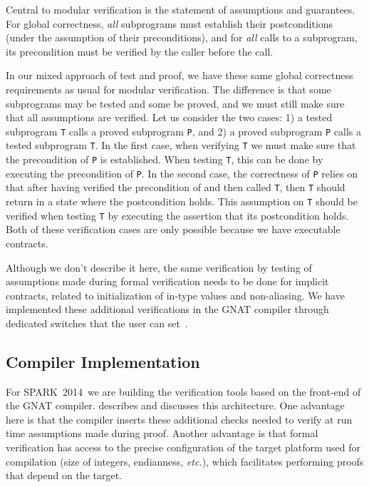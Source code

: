 \documentclass[sttt,final]{svjour}
\newcommand{\newspark}{SPARK~2014\xspace}
\newcommand{\etc}{\textit{etc.}\xspace}
\begin{document}
Central to modular verification is the statement of assumptions and
guarantees. For global correctness, \emph{all} subprograms must
establish their postconditions (under the assumption of their
preconditions), and for \emph{all} calls to a subprogram, its
precondition must be verified by the caller before the call.

In our mixed approach of test and proof, we have these same global
correctness requirements as usual for modular verification. The
difference is that some subprograms may be tested and some be proved,
and we must still make sure that all assumptions are verified. Let us
consider the two cases: 1) a tested subprogram \verb|T| calls a proved
subprogram \verb|P|, and 2) a proved subprogram \verb|P| calls a
tested subprogram \verb|T|. In the first case, when verifying \verb|T|
we must make sure that the precondition of \verb|P| is
established. When testing \verb|T|, this can be done by executing the
precondition of \verb|P|. In the second case, the correctness of
\verb|P| relies on that after having verified the precondition of and
then called \verb|T|, then \verb|T| should return in a state where the
postcondition holds. This assumption on \verb|T| should be verified
when testing \verb|T| by executing the assertion that its postcondition
holds. Both of these verification cases are only possible because we
have executable contracts.

Although we don't describe it here, the same verification by testing of
assumptions made during formal verification needs to be done for implicit
contracts, related to initialization of in-type values and non-aliasing. We
have implemented these additional verifications in the GNAT compiler through
dedicated switches that the user can set~\cite{hiliteERTS2012}.

\subsection{Compiler Implementation}
For \newspark\ we are building the verification tools based on the
front-end of the GNAT compiler. \cite{ksd2012} describes and discusses
this architecture. One advantage here is that the compiler inserts
these additional checks needed to verify at run time assumptions made
during proof. Another advantage is that formal verification has access
to the precise configuration of the target platform used for
compilation (size of integers, endianness, \etc), which facilitates
performing proofs that depend on the target.
\end{document}
